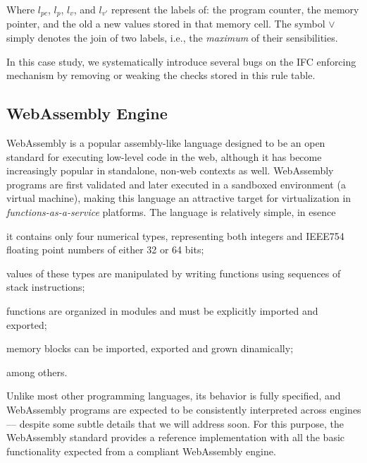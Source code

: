 \documentclass[acmsmall, anonymous]{acmart}
\begin{document}
Where $l_{pc}$, $l_{p}$, $l_{v}$, and $l_{v'}$ represent the labels of: the
program counter, the memory pointer, and the old a new values stored in that
memory cell.
%
The symbol $\vee$ simply denotes the join of two labels, i.e., the
\emph{maximum} of their sensibilities.

In this case study, we systematically introduce several bugs on the IFC
enforcing mechanism by removing or weaking the checks stored in this rule table.

\subsection{WebAssembly Engine}

WebAssembly is a popular assembly-like language designed to be an open standard
for executing low-level code in the web, although it has become increasingly
popular in standalone, non-web contexts as well.
%
WebAssembly programs are first validated and later executed in a sandboxed
environment (a virtual machine), making this language an attractive target for
virtualization in \emph{functions-as-a-service} platforms.
%
The language is relatively simple, in esence
%
\begin{inparaenum}
  \item it contains only four numerical types, representing both integers and
    IEEE754 floating point numbers of either 32 or 64 bits;
  \item values of these types are manipulated by writing functions using
    sequences of stack instructions;
  \item functions are organized in modules and must be explicitly imported and
    exported;
  \item memory blocks can be imported, exported and grown dinamically;
\end{inparaenum}
%
among others.
%


Unlike most other programming languages, its behavior is fully specified, and
WebAssembly programs are expected to be consistently interpreted across engines
--- despite some subtle details that we will address soon.
%
For this purpose, the WebAssembly standard provides a reference implementation
with all the basic functionality expected from a compliant WebAssembly engine.

\end{document}
